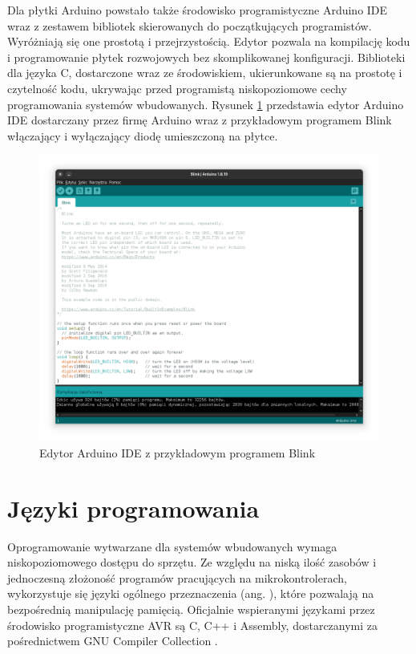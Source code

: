 Dla płytki Arduino powstało także środowisko programistyczne Arduino IDE wraz z zestawem bibliotek skierowanych do początkujących programistów. Wyróżniają się one prostotą i przejrzystością. Edytor pozwala na kompilację kodu i programowanie płytek rozwojowych bez skomplikowanej konfiguracji. Biblioteki dla języka C, dostarczone wraz ze środowiskiem, ukierunkowane są na prostotę i czytelność kodu, ukrywając przed programistą niskopoziomowe cechy programowania systemów wbudowanych. Rysunek \ref{fig:edytor} przedstawia edytor Arduino IDE dostarczany przez firmę Arduino wraz z przykładowym programem Blink włączający i wyłączający diodę umieszczoną na płytce.
\begin{figure}
\centering
	\includegraphics[width=1\textwidth]{graf/arduino-ide-blink.png}
	\caption{Edytor Arduino IDE z przykładowym programem Blink}
\label{fig:edytor}
\end{figure}

\section{Języki programowania}
Oprogramowanie wytwarzane dla systemów wbudowanych wymaga niskopoziomowego dostępu do sprzętu. Ze względu na niską ilość zasobów i jednoczesną złożoność programów pracujących na mikrokontrolerach, wykorzystuje się języki ogólnego przeznaczenia (ang. ), które pozwalają na bezpośrednią manipulację pamięcią. Oficjalnie wspieranymi językami przez środowisko programistyczne AVR są C, C++ i Assembly, dostarczanymi za pośrednictwem GNU Compiler Collection \cite{GCCCompilersAVR}.

